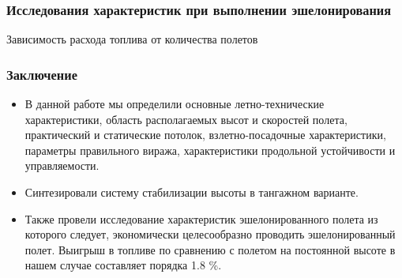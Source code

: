 \documentclass{beamer}
\begin{document}
\begin{frame}[t]
    \frametitle{Исследования характеристик при выполнении эшелонирования}
    \begin{center}
        Зависимость расхода топлива от количества полетов 
        \resizebox{0.7\textwidth}{!}{}
    \end{center}
\end{frame}

\begin{frame}[t]
    \frametitle{Заключение}
    \begin{itemize}
        \item В данной работе мы определили основные летно-технические характеристики,
            область располагаемых высот и скоростей полета, практический и статические
            потолок, взлетно-посадочные характеристики, параметры правильного виража, 
            характеристики продольной устойчивости и управляемости.
        \item Синтезировали систему стабилизации высоты в тангажном варианте.
        \item Также провели исследование характеристик эшелонированного полета
            из которого следует, экономически целесообразно проводить
            эшелонированный полет. Выигрыш в топливе по сравнению с полетом на
            постоянной высоте в нашем случае составляет порядка 1.8 \%. 
    \end{itemize}
\end{frame}
\end{document}
